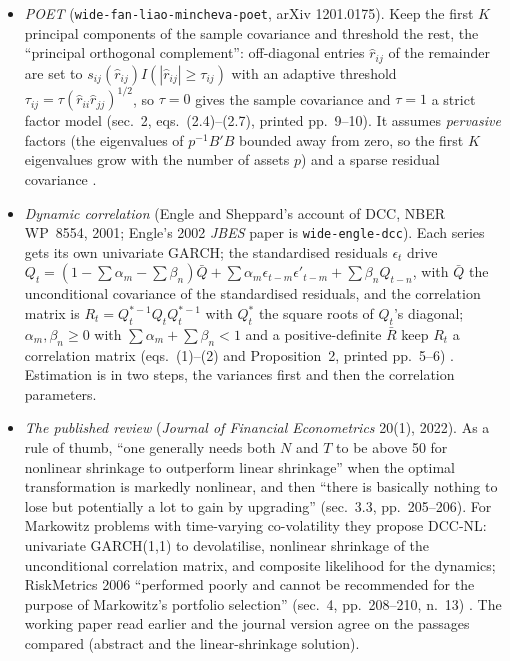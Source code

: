 \begin{qfmethod}
\begin{itemize}
Numerically, with 50 assets and 60 observations the shrunk matrix has the lower Frobenius loss; the intensity goes to one when the population really has a constant correlation (the target is then right) and is about 0.3 when correlations come in blocks; with more assets than observations the shrunk matrix is invertible and the sample matrix is not.
\item \emph{POET} (\nolinkurl{wide-fan-liao-mincheva-poet}, arXiv 1201.0175). Keep the first $K$ principal components of the sample covariance and threshold the rest, the ``principal orthogonal complement'': off-diagonal entries $\hat r_{ij}$ of the remainder are set to $s_{ij}(\hat r_{ij})I(|\hat r_{ij}|\ge\tau_{ij})$ with an adaptive threshold $\tau_{ij}=\tau(\hat r_{ii}\hat r_{jj})^{1/2}$, so $\tau=0$ gives the sample covariance and $\tau=1$ a strict factor model (sec.~2, eqs.~(2.4)--(2.7), printed pp.~9--10). It assumes \emph{pervasive} factors (the eigenvalues of $p^{-1}B'B$ bounded away from zero, so the first $K$ eigenvalues grow with the number of assets $p$) and a sparse residual covariance \citep[sec.~2, printed pp.~6--10]{wide-fan-liao-mincheva-poet}.
\item \emph{Dynamic correlation} (Engle and Sheppard's account of DCC, NBER WP~8554, 2001; Engle's 2002 \emph{JBES} paper is \nolinkurl{wide-engle-dcc}). Each series gets its own univariate GARCH; the standardised residuals $\epsilon_t$ drive $Q_t=(1-\sum\alpha_m-\sum\beta_n)\bar Q+\sum\alpha_m\epsilon_{t-m}\epsilon'_{t-m}+\sum\beta_nQ_{t-n}$, with $\bar Q$ the unconditional covariance of the standardised residuals, and the correlation matrix is $R_t=Q_t^{*-1}Q_tQ_t^{*-1}$ with $Q_t^*$ the square roots of $Q_t$'s diagonal; $\alpha_m,\beta_n\ge0$ with $\sum\alpha_m+\sum\beta_n<1$ and a positive-definite $\bar R$ keep $R_t$ a correlation matrix (eqs.~(1)--(2) and Proposition~2, printed pp.~5--6) \citep[secs.~2--3, printed pp.~5--6]{engle-sheppard-2001-dcc}. Estimation is in two steps, the variances first and then the correlation parameters.
\item \emph{The published review} (\emph{Journal of Financial Econometrics} 20(1), 2022). As a rule of thumb, ``one generally needs both $N$ and $T$ to be above 50 for nonlinear shrinkage to outperform linear shrinkage'' when the optimal transformation is markedly nonlinear, and then ``there is basically nothing to lose but potentially a lot to gain by upgrading'' (sec.~3.3, pp.~205--206). For Markowitz problems with time-varying co-volatility they propose DCC-NL: univariate GARCH(1,1) to devolatilise, nonlinear shrinkage of the unconditional correlation matrix, and composite likelihood for the dynamics; RiskMetrics 2006 ``performed poorly and cannot be recommended for the purpose of Markowitz's portfolio selection'' (sec.~4, pp.~208--210, n.~13) \citep[2022 journal version, secs.~3.3--4, pp.~205--210]{wide-ledoit-wolf-review}. The working paper read earlier and the journal version agree on the passages compared (abstract and the linear-shrinkage solution).
\end{itemize}


\end{qfmethod}
